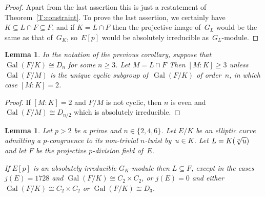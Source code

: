 \documentclass[12pt, reqno]{amsart}
\DeclareMathOperator{\Gal}{Gal}
\numberwithin{equation}{section}
\newtheorem{lemma}[theorem]{Lemma}
\theoremstyle{definition}
\theoremstyle{remark}
\begin{document}
\begin{proof}
Apart from the last assertion this is just a restatement of
Theorem~\ref{T:constraint}.  To prove the last assertion, we certainly
have $K\subseteq L\cap F\subseteq F$, and if $K=L\cap F$ then the
projective image of~$G_L$ would be the same as that of~$G_K$,
so~$E[p]$ would be absolutely irreducible as~$G_L$-module.
\end{proof}

\begin{lemma}\label{L:dihedral-to-reducible}
In the notation of the previous corollary, suppose that
$\Gal(F/K)\cong D_n$ for some $n\ge3$.  Let $M=L\cap F$ Then $[M:K]
\ge3$ unless $\Gal(F/M)$ is the unique cyclic subgroup of~$\Gal(F/K)$
of order~$n$, in which case $[M:K]=2$.
\end{lemma}
\begin{proof}
If $[M:K]=2$ and $F/M$ is not cyclic, then $n$ is even and
$\Gal(F/M)\cong D_{n/2}$ which is absolutely irreducible.
\end{proof}

\begin{lemma} \label{L:LinF}
Let $p > 2$ be a prime and $n \in \{2,4,6\}$.  Let $E/K$ be an
elliptic curve admitting a $p$-congruence to its non-trivial $n$-twist
by~$u \in K$. Let $L = K(\root n \of u)$ and let $F$ be the projective
$p$-division field of~$E$.

If $E[p]$ is an absolutely irreducible $G_K$-module then $L \subseteq
F$, except in the cases $j(E)=1728$ and $\Gal(F/K)\cong C_2\times
C_2$, or $j(E)=0$ and either $\Gal(F/K)\cong C_2\times C_2$ or
$\Gal(F/K)\cong D_3$.
\end{lemma}
\end{document}
